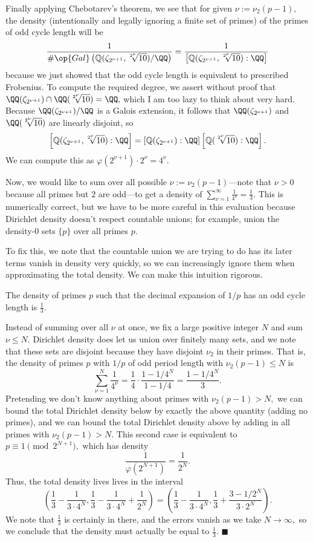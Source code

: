 Finally applying Chebotarev's theorem, we see that for given $\nu:=\nu_2(p-1),$ the density (intentionally and legally ignoring a finite set of primes) of the primes of odd cycle length will be
\[\frac1{\#\op{Gal}\left(\mathbb Q(\zeta_{2^{\nu+1}},\sqrt[2^\nu]{10})/\QQ\right)}=\frac1{\left[\mathbb Q(\zeta_{2^{\nu+1}},\sqrt[2^\nu]{10}):\QQ\right]}\]
because we just showed that the odd cycle length is equivalent to prescribed Frobenius. To compute the required degree, we assert without proof that $\QQ(\zeta_{2^{\nu+1}})\cap\QQ(\sqrt[2^\nu]{10})=\QQ,$ which I am too lazy to think about very hard. Because $\QQ(\zeta_{2^{\nu+1}})/\QQ$ is a Galois extension, it follows that $\QQ(\zeta_{2^{\nu+1}})$ and $\QQ(\sqrt[2^\nu]{10})$ are linearly disjoint, so
\[\left[\mathbb Q(\zeta_{2^{\nu+1}},\sqrt[2^\nu]{10}):\QQ\right]=\left[\mathbb Q(\zeta_{2^{\nu+1}}):\QQ\right]\left[\mathbb Q(\sqrt[2^\nu]{10}):\QQ\right].\]
We can compute this as $\varphi\left(2^{\nu+1}\right)\cdot2^\nu=4^\nu.$

Now, we would like to sum over all possible $\nu:=\nu_2(p-1)$---note that $\nu>0$ because all primes but $2$ are odd---to get a density of $\sum_{\nu=1}^\infty\frac1{4^\nu}=\frac13.$ This is numerically correct, but we have to be more careful in this evaluation because Dirichlet density doesn't respect countable unions; for example, union the density-$0$ sets $\{p\}$ over all primes $p.$

To fix this, we note that the countable union we are trying to do has its later terms vanish in density very quickly, so we can increasingly ignore them when approximating the total density. We can make this intuition rigorous.
\begin{theorem}
    The density of primes $p$ such that the decimal expansion of $1/p$ has an odd cycle length is $\frac13.$
\end{theorem}
Instead of summing over all $\nu$ at once, we fix a large positive integer $N$ and sum $\nu\le N.$ Dirichlet density does let us union over finitely many sets, and we note that these sets are disjoint because they have disjoint $\nu_2$ in their primes. That is, the density of primes $p$ with $1/p$ of odd period length with $\nu_2(p-1)\le N$ is
\[\sum_{\nu=1}^N\frac1{4^\nu}=\frac14\cdot\frac{1-1/4^N}{1-1/4}=\frac{1-1/4^N}3.\]
Pretending we don't know anything about primes with $\nu_2(p-1)>N,$ we can bound the total Dirichlet density below by exactly the above quantity (adding no primes), and we can bound the total Dirichlet density above by adding in all primes with $\nu_2(p-1)>N.$ This second case is equivalent to $p\equiv1\pmod{2^{N+1}},$ which has density
\[\frac1{\varphi\left(2^{N+1}\right)}=\frac1{2^N}.\]
Thus, the total density lives lives in the interval
\[\left(\frac13-\frac1{3\cdot4^N},\frac13-\frac1{3\cdot4^N}+\frac1{2^N}\right)=\left(\frac13-\frac1{3\cdot4^N},\frac13+\frac{3-1/2^N}{3\cdot2^N}\right).\]
We note that $\frac13$ is certainly in there, and the errors vanish as we take $N\to\infty,$ so we conclude that the density must actually be equal to $\frac13.$ $\blacksquare$

